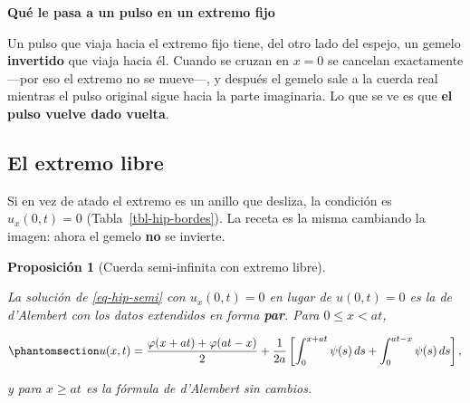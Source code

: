 \documentclass[
  spanish,
  a4paper,
]{scrbook}
\theoremstyle{definition}
\theoremstyle{plain}
\newtheorem{proposition}{Proposición}[chapter]
\theoremstyle{definition}
\theoremstyle{plain}
\theoremstyle{definition}
\theoremstyle{remark}
\begin{document}
\begin{tcolorbox}[enhanced jigsaw, arc=.35mm, bottomrule=.15mm, breakable, colback=white, colframe=quarto-callout-important-color-frame, left=2mm, leftrule=.75mm, opacityback=0, rightrule=.15mm, toprule=.15mm]
\begin{minipage}[t]{5.5mm}
\textcolor{quarto-callout-important-color}{\faExclamation}
\end{minipage}%
\begin{minipage}[t]{\textwidth - 5.5mm}

\vspace{-3mm}\textbf{Qué le pasa a un pulso en un extremo fijo}\vspace{3mm}

Un pulso que viaja hacia el extremo fijo tiene, del otro lado del
espejo, un gemelo \textbf{invertido} que viaja hacia él. Cuando se
cruzan en \(x=0\) se cancelan exactamente ---por eso el extremo no se
mueve---, y después el gemelo sale a la cuerda real mientras el pulso
original sigue hacia la parte imaginaria. Lo que se ve es que \textbf{el
pulso vuelve dado vuelta}.

\end{minipage}%
\end{tcolorbox}

\subsection{El extremo libre}\label{sec-hip-semi-libre}

Si en vez de atado el extremo es un anillo que desliza, la condición es
\(u_x(0,t) = 0\) (Tabla~\ref{tbl-hip-bordes}). La receta es la misma
cambiando la imagen: ahora el gemelo \textbf{no} se invierte.

\begin{proposition}[Cuerda semi-infinita con extremo
libre]\protect\hypertarget{prp-hip-semi-libre}{}\label{prp-hip-semi-libre}

La solución de \ref{eq-hip-semi} con \(u_x(0,t)=0\) en lugar de
\(u(0,t)=0\) es la de d'Alembert con los datos extendidos en forma
\textbf{par}. Para \(0\le x<at\),

\begin{equation}\protect\phantomsection\label{eq-hip-semi-libre}{
u(x,t) = \frac{\varphi(x+at)+\varphi(at-x)}{2} + \frac{1}{2a}\left[\int_{0}^{x+at}\psi(s)\,ds + \int_{0}^{at-x}\psi(s)\,ds\right],
}\end{equation}

y para \(x\ge at\) es la fórmula de d'Alembert sin cambios.

\end{proposition}
\end{document}

